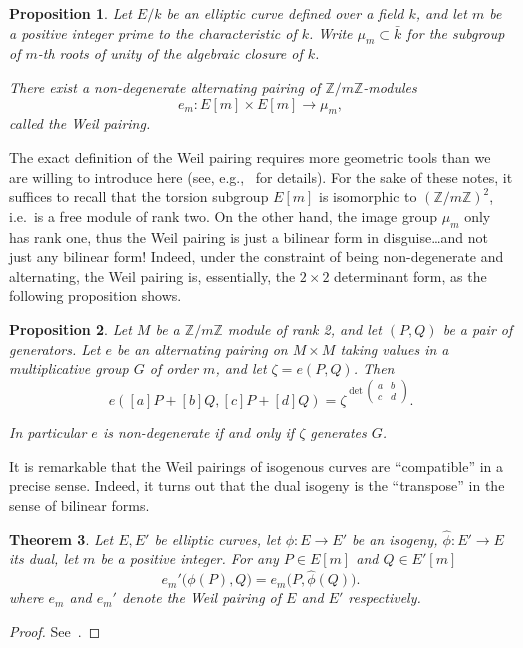 \documentclass[10pt]{article}
\theoremstyle{plain}
\newtheorem{theorem}{Theorem}
\newtheorem{proposition}[theorem]{Proposition}
\theoremstyle{definition}
\begin{document}
\begin{proposition} 
  Let $E/k$ be an elliptic curve defined over a field $k$, and let $m$
  be a positive integer prime to the characteristic of $k$. %
  Write $\mu_m\subset\bar{k}$ for the subgroup of $m$-th roots of
  unity of the algebraic closure of $k$.
  
  There exist a non-degenerate alternating pairing of $ℤ/mℤ$-modules
  \[e_m:E[m]\times E[m]\to \mu_m,\]
  called the \emph{Weil pairing}.
\end{proposition}

The exact definition of the Weil pairing requires more geometric tools
than we are willing to introduce here (see,
e.g.,~\cite{silverman:elliptic,galbraith2012mathematics} for
details). %
For the sake of these notes, it suffices to recall that the torsion
subgroup $E[m]$ is isomorphic to $(ℤ/mℤ)^2$, i.e.\ is a free module of
rank two. %
On the other hand, the image group $\mu_m$ only has rank one, thus the
Weil pairing is just a bilinear form in disguise\dots and not just any
bilinear form! %
Indeed, under the constraint of being non-degenerate and alternating,
the Weil pairing is, essentially, the $2×2$ determinant form, as the
following proposition shows.

\begin{proposition}
  \label{prop:weil-det}
  Let $M$ be a $ℤ/mℤ$ module of rank 2, and let $(P,Q)$ be a pair of
  generators. %
  Let $e$ be an alternating pairing on $M×M$ taking values in a
  multiplicative group $G$ of order $m$, and let $\zeta = e(P,Q)$. %
  Then
  \[e([a]P + [b]Q, [c]P + [d]Q) =
    \zeta^{\det\left(\begin{smallmatrix}a&b\\c&d\end{smallmatrix}\right)}.\]

  In particular $e$ is non-degenerate if and only if $\zeta$ generates $G$.
\end{proposition}

It is remarkable that the Weil pairings of isogenous curves are
``compatible'' in a precise sense. %
Indeed, it turns out that the dual isogeny is the ``transpose'' in the
sense of bilinear forms.

\begin{theorem}
  Let $E,E'$ be elliptic curves, let $\phi:E\to E'$ be an isogeny,
  $\hat\phi:E'\to E$ its dual, let $m$ be a positive integer. %
  For any $P\in E[m]$ and $Q\in E'[m]$
  \begin{equation}
    \label{eq:pairing-isog}
    e_m'\bigl(\phi(P), Q\bigr) = e_m\bigl(P, \hat\phi(Q)\bigr).
  \end{equation}
  where $e_m$ and $e_m'$ denote the Weil pairing of $E$ and $E'$
  respectively.
\end{theorem}
\begin{proof}
  See~\cite[III.8.2]{silverman:elliptic}.
\end{proof}
\end{document}
